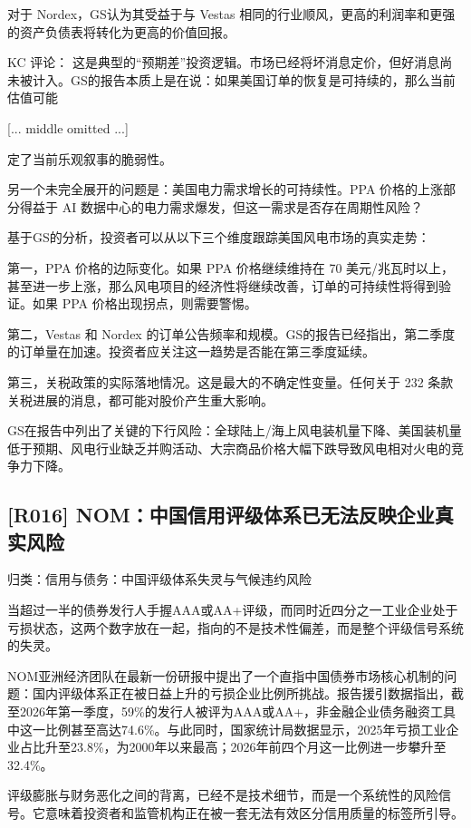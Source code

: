 \documentclass[11pt]{ctexart}
\begin{document}
对于 Nordex，GS认为其受益于与 Vestas 相同的行业顺风，更高的利润率和更强的资产负债表将转化为更高的价值回报。

KC 评论： 这是典型的“预期差”投资逻辑。市场已经将坏消息定价，但好消息尚未被计入。GS的报告本质上是在说：如果美国订单的恢复是可持续的，那么当前估值可能

[... middle omitted ...]

定了当前乐观叙事的脆弱性。

另一个未完全展开的问题是：美国电力需求增长的可持续性。PPA 价格的上涨部分得益于 AI 数据中心的电力需求爆发，但这一需求是否存在周期性风险？

基于GS的分析，投资者可以从以下三个维度跟踪美国风电市场的真实走势：

第一，PPA 价格的边际变化。如果 PPA 价格继续维持在 70 美元/兆瓦时以上，甚至进一步上涨，那么风电项目的经济性将继续改善，订单的可持续性将得到验证。如果 PPA 价格出现拐点，则需要警惕。

第二，Vestas 和 Nordex 的订单公告频率和规模。GS的报告已经指出，第二季度的订单量在加速。投资者应关注这一趋势是否能在第三季度延续。

第三，关税政策的实际落地情况。这是最大的不确定性变量。任何关于 232 条款关税进展的消息，都可能对股价产生重大影响。

GS在报告中列出了关键的下行风险：全球陆上/海上风电装机量下降、美国装机量低于预期、风电行业缺乏并购活动、大宗商品价格大幅下跌导致风电相对火电的竞争力下降。

\subsection{[R016] NOM：中国信用评级体系已无法反映企业真实风险}
{\small\color{refgray}归类：信用与债务：中国评级体系失灵与气候违约风险}

当超过一半的债券发行人手握AAA或AA+评级，而同时近四分之一工业企业处于亏损状态，这两个数字放在一起，指向的不是技术性偏差，而是整个评级信号系统的失灵。

NOM亚洲经济团队在最新一份研报中提出了一个直指中国债券市场核心机制的问题：国内评级体系正在被日益上升的亏损企业比例所挑战。报告援引数据指出，截至2026年第一季度，59\%的发行人被评为AAA或AA+，非金融企业债务融资工具中这一比例甚至高达74.6\%。与此同时，国家统计局数据显示，2025年亏损工业企业占比升至23.8\%，为2000年以来最高；2026年前四个月这一比例进一步攀升至32.4\%。

评级膨胀与财务恶化之间的背离，已经不是技术细节，而是一个系统性的风险信号。它意味着投资者和监管机构正在被一套无法有效区分信用质量的标签所引导。
\end{document}
